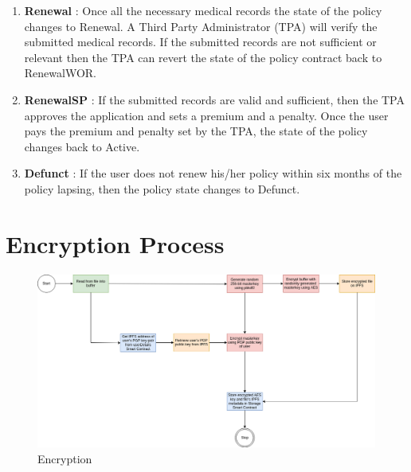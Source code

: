 \begin{enumerate}
 \item \textbf{Renewal} : Once all the necessary medical records the state of the policy changes to Renewal. A Third Party Administrator (TPA) will verify the submitted medical records. If the submitted records are not sufficient or relevant then the TPA can revert the state of the policy contract back to RenewalWOR.
 
\item \textbf{RenewalSP} : If the submitted records are valid and sufficient, then the TPA approves the application and sets a premium and a penalty. Once the user pays the premium and penalty set by the TPA, the state of the policy changes back to Active.

 \item \textbf{Defunct} : If the user does not renew his/her policy within six months of the policy lapsing, then the policy state changes to Defunct. 

\end{enumerate}


\section{Encryption Process}
\begin{figure}[!h]
	\centering
	\includegraphics[width=\linewidth]{Images/Encryption.png}
	\caption{Encryption}
\end{figure} 

